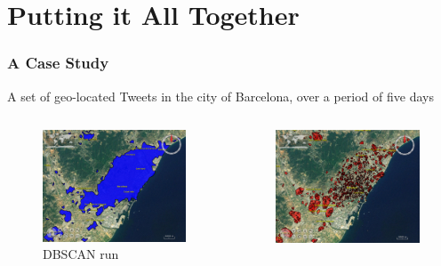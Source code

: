 \documentclass[hyperref={pdfpagelabels=true}]{beamer}
\begin{document}
\section{Putting it All Together} 
\begin{frame}
\frametitle{A Case Study}
 A set of geo-located Tweets in the city of Barcelona, over a period of five days
\begin{columns}
  \begin{column}{0.5\textwidth}
    \begin{figure}  
	\includegraphics[width=\textwidth]{sim1b.png}\\
           \tiny{DBSCAN run}%
       \end{figure}             
  \end{column}
  \begin{column}{0.5\textwidth}
      \begin{figure}  
	\includegraphics[width=\textwidth]{sim6.png}\\

\end{figure}
\end{column}
\end{columns}
\end{frame}
\end{document}

